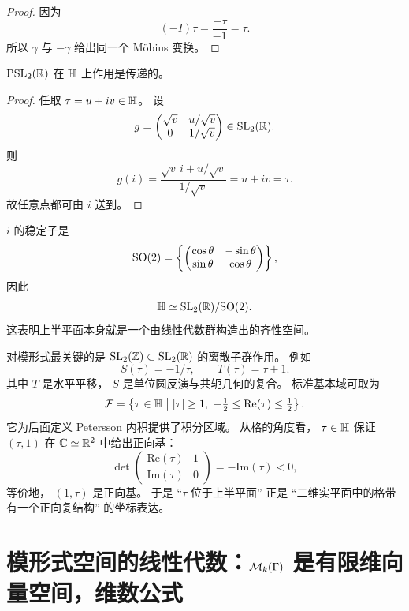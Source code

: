 \begin{proof} 因为 \[ (-I)\tau=\frac{-\tau}{-1}=\tau. \] 所以 $\gamma$ 与 $-\gamma$ 给出同一个 Möbius 变换。 \end{proof}




\begin{proposition} $\mathrm{PSL}_2(\mathbb{R})$ 在 $\mathbb{H}$ 上作用是传递的。 \end{proposition}




\begin{proof} 任取 $\tau=u+iv\in\mathbb{H}$。 设 \[ g= \begin{pmatrix} \sqrt v & u/\sqrt v\\ 0&1/\sqrt v \end{pmatrix}\in \mathrm{SL}_2(\mathbb{R}). \] 则 \[ g(i)=\frac{\sqrt v\,i+u/\sqrt v}{1/\sqrt v}=u+iv=\tau. \] 故任意点都可由 $i$ 送到。 \end{proof}




\begin{remark} $i$ 的稳定子是 \[ \mathrm{SO}(2)= \left\{ \begin{pmatrix} \cos\theta&-\sin\theta\\ \sin\theta&\cos\theta \end{pmatrix} \right\}, \] 因此 \[ \mathbb{H}\simeq \mathrm{SL}_2(\mathbb{R})/\mathrm{SO}(2). \] 这表明上半平面本身就是一个由线性代数群构造出的齐性空间。 \end{remark} 对模形式最关键的是 $\mathrm{SL}_2(\mathbb{Z})\subset\mathrm{SL}_2(\mathbb{R})$ 的离散子群作用。 例如 \[ S(\tau)=-1/\tau,\qquad T(\tau)=\tau+1. \] 其中 $T$ 是水平平移， $S$ 是单位圆反演与共轭几何的复合。 标准基本域可取为 \[ \mathcal F= \left\{ \tau\in\mathbb{H}\;\middle|\; |\tau|\ge1,\ -\tfrac12\le\mathrm{Re}(\tau)\le\tfrac12 \right\}. \] 它为后面定义 Petersson 内积提供了积分区域。 从格的角度看， $\tau\in\mathbb{H}$ 保证 $(\tau,1)$ 在 $\mathbb{C}\simeq\mathbb{R}^2$ 中给出正向基： \[ \det \begin{pmatrix} \mathrm{Re}(\tau)&1\\ \mathrm{Im}(\tau)&0 \end{pmatrix} =-\mathrm{Im}(\tau)<0, \] 等价地， $(1,\tau)$ 是正向基。 于是 “$\tau$ 位于上半平面” 正是 “二维实平面中的格带有一个正向复结构” 的坐标表达。




\section{模形式空间的线性代数：$\mathcal{M}_k(\Gamma)$ 是有限维向量空间，维数公式}




